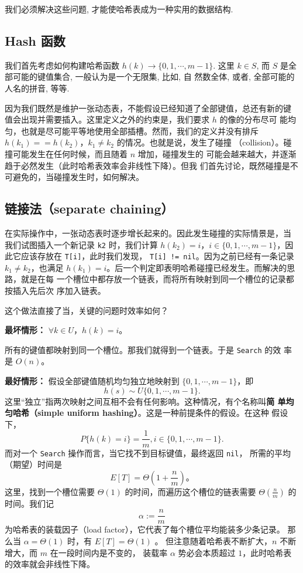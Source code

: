 \documentclass[a4paper]{ctexart}
\theoremstyle{definition}
\theoremstyle{definition}
\begin{document}
我们必须解决这些问题, 才能使哈希表成为一种实用的数据结构.

\subsection{Hash 函数}

我们首先考虑如何构建哈希函数 $h(k) \to \{0, 1, \cdots, m - 1\}$. 这里
$k \in S$, 而 $S$ 是全部可能的键值集合, 一般认为是一个无限集, 比如, 自
然数全体, 或者, 全部可能的人名的拼音, 等等.

因为我们既然是维护一张动态表，不能假设已经知道了全部键值，总还有新的键
值会出现并需要插入。这里定义之外的约束是，我们要求 $h$ 的像的分布尽可
能均匀，也就是尽可能平等地使用全部插槽。然而，我们的定义并没有排斥
$h(k_1) == h(k_2)$，$k_1 \neq k_2$ 的情况。也就是说，发生了碰撞
（collision）。碰撞可能发生在任何时候，而且随着 $n$ 增加，碰撞发生的
可能会越来越大，并逐渐趋于必然发生（此时哈希表效率会非线性下降）。但我
们首先讨论，既然碰撞是不可避免的，当碰撞发生时，如何解决。

\subsection{链接法（separate chaining）}

在实际操作中，一张动态表时逐步增长起来的。因此发生碰撞的实际情景是，当
我们试图插入一个新记录 \verb|k2| 时，我们计算 $h(k_2) = i$，$i \in
\{0, 1, \cdots, m - 1\}$，因此它应该存放在 \verb|T[i]|，此时我们发现，
\verb|T[i] != nil|。因为之前已经有一条记录 $k_1 \neq k_2$，也满足
$h(k_1) = i$。后一个判定即表明哈希碰撞已经发生。而解决的思路，就是在每
一个槽位中都存放一个链表，而将所有映射到同一个槽位的记录都按插入先后次
序加入链表。

这个做法直接了当，关键的问题时效率如何？

{\bf 最坏情形：} $\forall k \in U$，$h(k) = i$。

所有的键值都映射到同一个槽位。那我们就得到一个链表。于是 \verb|Search| 的效
率是 $O(n)$。

{\bf 最好情形：} 假设全部键值随机均匀独立地映射到 $\{0, 1, \cdots, m -
1\}$，即
$$
h(s) \sim U\{0, 1, \cdots, m - 1\}.
$$
这里“独立”指两次映射之间互相不会有任何影响。这种情况，有个名称叫{\bf 简
单均匀哈希（simple uniform hashing）}。这是一种前提条件的假设。在这种
假设下，
$$
P\{h(k) = i\} = \frac{1}{m}, i \in \{0, 1, \cdots, m - 1\}.
$$
而对一个 \verb|Search| 操作而言，当它找不到目标键值，最终返回 \verb|nil|，
所需的平均（期望）时间是
$$
E[T] = \Theta(1 + \frac{n}{m})。
$$
这里，找到一个槽位需要 $\Theta(1)$ 的时间，而遍历这个槽位的链表需要
$\Theta(\frac{n}{m})$ 的时间。我们记
$$
\alpha := \frac{n}{m}
$$
为哈希表的装载因子（load factor），它代表了每个槽位平均能装多少条记录。
那么当 $\alpha = \Theta(1)$ 时，有 $E[T] = \Theta(1)$ 。
但注意随着哈希表不断扩大，$n$ 不断增大，而 $m$ 在一段时间内是不变的，
装载率 $\alpha$ 势必会本质超过 $1$，此时哈希表的效率就会非线性下降。
\end{document}
